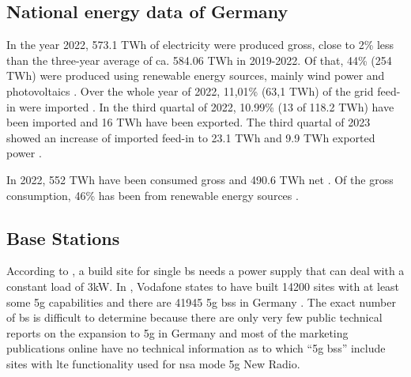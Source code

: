 \documentclass[11pt,a4paper]{article}
\begin{document}
\subsection{National energy data of Germany}\label{subsec:nationalaverage}
In the year 2022, 573.1 TWh of electricity were produced gross, close to 2\% less than the three-year average of ca. 584.06 TWh in 2019-2022.
Of that, 44\% (254 TWh) were produced using renewable energy sources, mainly wind power and photovoltaics \citep{Bruttostromerzeugung}.
Over the whole year of 2022, 11,01\% (63,1 TWh) of the grid feed-in were imported \citep{energieErzeugung}.
In the third quartal of 2022, 10.99\% (13 of 118.2 TWh) have been imported and 16 TWh have been exported.
The third quartal of 2023 showed an increase of imported feed-in to 23.1 TWh and 9.9 TWh exported power \citep{stromerzeugung3Quartal2023}.

In 2022, 552 TWh have been consumed gross \citep{Stromverbrauch} and 490.6 TWh net \citep{NettoStromverbrauch}.
Of the gross consumption, 46\% has been from renewable energy sources \citep{Stromverbrauch}.

\subsection{Base Stations}\label{subsec:BSInfluence}

According to \cite{BSStandort}, a build site for single \acrshort{bs} needs a power supply that can deal with a constant load of 3kW.
In \cite{vodafoneAusbau}, Vodafone states to have built 14200 sites with at least some \acrshort{5g} capabilities and there are 41945 \acrshort{5g} \acrlong{bs}s in Germany \citep{5gBS}.
The exact number of \acrshort*{bs} is difficult to determine because there are only very few public technical reports on the expansion to \acrshort{5g} in Germany and most of the marketing publications online have no technical information as to which \enquote{\acrshort{5g} \acrlong{bs}s} include sites with \acrfull{lte} functionality used for \acrfull{nsa} mode \acrshort{5g} New Radio.
\end{document}
